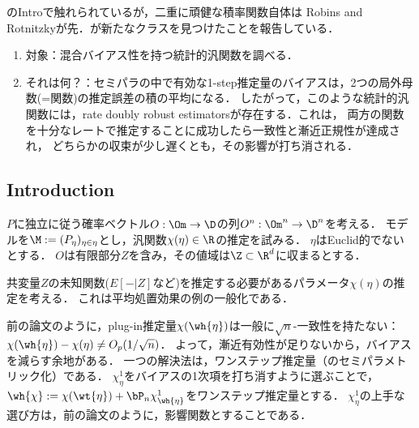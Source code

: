 \documentclass[uplatex,dvipdfmx]{jsreport}
\begin{document}
\begin{history}
    \cite{Chernozhukov-Ichimura-Newey22-LocallyRobust}のIntroで触れられているが，二重に頑健な積率関数自体は
    Robins and Rotnitzkyが先．\cite{Chernozhukov-Ichimura-Newey22-LocallyRobust}が新たなクラスを見つけたことを報告している．
\end{history}

\begin{enumerate}
    \item 対象：混合バイアス性を持つ統計的汎関数を調べる．
    \item それは何？：セミパラの中で有効な1-step推定量のバイアスは，2つの局外母数(=関数)の推定誤差の積の平均になる．
    したがって，このような統計的汎関数には，rate doubly robust estimatorsが存在する．これは，
    両方の関数を十分なレートで推定することに成功したら一致性と漸近正規性が達成され，
    どちらかの収束が少し遅くとも，その影響が打ち消される．
\end{enumerate}

\subsection{Introduction}

\begin{notation}
    $P$に独立に従う確率ベクトル$O:\Om\to\D$の列$O^n:\Om^n\to\D^n$を考える．
    モデルを$\M:=(P_\eta)_{\eta\in\eta}$とし，汎関数$\chi(\eta)\in\R$の推定を試みる．
    $\eta$はEuclid的でないとする．
    $O$は有限部分$Z$を含み，その値域は$\Z\subset\R^d$に収まるとする．
\end{notation}

\begin{problem}
    共変量$Z$の未知関数($E[-|Z]$など)を推定する必要があるパラメータ$\chi(\eta)$の推定を考える．
    これは平均処置効果の例の一般化である．
\end{problem}

\begin{discussion}
    前の論文のように，plug-in推定量$\chi(\wh{\eta})$は一般に$\sqrt{n}$-一致性を持たない：$\chi(\wh{\eta})-\chi(\eta)\ne O_p(1/\sqrt{n})$．
    よって，漸近有効性が足りないから，バイアスを減らす余地がある．
    一つの解決法は，ワンステップ推定量（のセミパラメトリック化）である．
    $\chi_\eta^1$をバイアスの1次項を打ち消すように選ぶことで，$\wh{\chi}:=\chi(\wt{\eta})+\bP_n\chi^1_{\wh{\eta}}$をワンステップ推定量とする．
    $\chi^1_\eta$の上手な選び方は，前の論文のように，影響関数とすることである．
\end{discussion}
\end{document}

